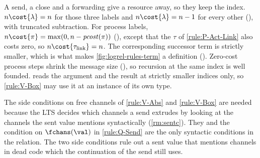 A send, a close and a forwarding give a resource away, so they keep the
index. $n \cost{\lambda} = n$ for those three labels and
$n \cost{\lambda} = n - 1$ for every other (), with
truncated subtraction. For process labels,
$n \cost{\pi} = \max(0, n - \mathit{pcost}(\pi))$ (), except that the
$\tau$ of \ref{rule:P-Act-Link} also costs zero, so
$n \cost{\tau_{\mathrm{link}}} = n$.
The corresponding successor term is strictly smaller, which is what
makes \cref{fig:logrel-rules-term} a definition ().
Zero-cost process steps shrink the message size (),
so recursion at the same index is well founded.
 reads the argument and the result at strictly smaller
indices only, so \ref{rule:V-Box} may use it at an instance of its own
type.

\begin{remark}
\label{rm:vabs}
  The side conditions on free channels of \ref{rule:V-Abs} and
  \ref{rule:V-Box} are needed because the LTS decides which channels a
  send extrudes by looking at the channels the sent value mentions
  syntactically (\cref{rm:sentc}). They and the condition on
  $\fchans(\val)$ in \ref{rule:Q-Send} are the only syntactic
  conditions in the relation. The two side conditions rule out a sent value that
  mentions channels in dead code which the continuation of the send
  still uses.
\end{remark}

